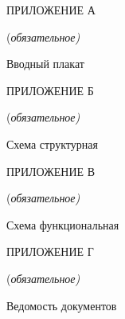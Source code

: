 \newpage
\centerline{ПРИЛОЖЕНИЕ А}
\centerline{(\it{обязательное})}
\centerline{Вводный плакат}
\label{sec:appendix_a}

\newpage
\centerline{ПРИЛОЖЕНИЕ Б}
\centerline{(\it{обязательное})}
\centerline{Схема структурная}
\label{sec:appendix_b}

\newpage
\centerline{ПРИЛОЖЕНИЕ В}
\centerline{(\it{обязательное})}
\centerline{Схема функциональная}
\label{sec:appendix_c}

\newpage
\centerline{ПРИЛОЖЕНИЕ Г}
\centerline{(\it{обязательное})}
\centerline{Ведомость документов}
\label{sec:appendix_d}
